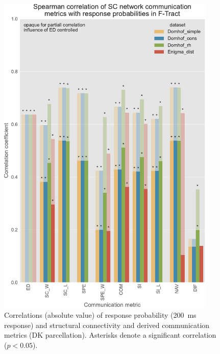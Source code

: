\begin{figure}
    \centering
    \includegraphics[width=0.93\textwidth]{images/nootebook_generated/ftract_results/DKT/5/ED0/0.25/long/Spearman_correlation_of_SC_network_communication_metrics_with_response_probabilities_in_F-Tract.pdf}
    \caption[F-TRACT probability correlations - all $SC$ matrices (DK)]{Correlations (absolute value) of response probability (200~ms response) and structural connectivity and derived communication metrics (DK parcellation). Asterisks denote a significant correlation ($p<0.05$).}
    \label{fig:ftract_alldata_long_probabilities_DK}
\end{figure}

